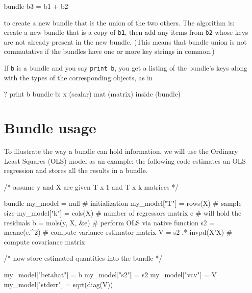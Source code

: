 \begin{code}
bundle b3 = b1 + b2
\end{code}

to create a new bundle that is the union of the two others. The
algorithm is: create a new bundle that is a copy of \texttt{b1}, then
add any items from \texttt{b2} whose keys are not already present in
the new bundle. (This means that bundle union is not commutative if
the bundles have one or more key strings in common.)

If \texttt{b} is a bundle and you say \texttt{print b}, you get a
listing of the bundle's keys along with the types of the corresponding
objects, as in

\begin{code}
? print b
bundle b:
 x (scalar)
 mat (matrix)
 inside (bundle)
\end{code}

\section{Bundle usage}
\label{sec:bundle-usage}

To illustrate the way a bundle can hold information, we will use the
Ordinary Least Squares (OLS) model as an example: the following code
estimates an OLS regression and stores all the results in a bundle.

\begin{code}
/* assume y and X are given T x 1 and T x k matrices */

bundle my_model = null               # initialization
my_model["T"] = rows(X)              # sample size
my_model["k"] = cols(X)              # number of regressors
matrix e                             # will hold the residuals
b = mols(y, X, &e)                   # perform OLS via native function
s2 = meanc(e.^2)                     # compute variance estimator
matrix V = s2 .* invpd(X'X)          # compute covariance matrix

/* now store estimated quantities into the bundle */

my_model["betahat"] = b
my_model["s2"] = s2
my_model["vcv"] = V
my_model["stderr"] = sqrt(diag(V))
\end{code}

